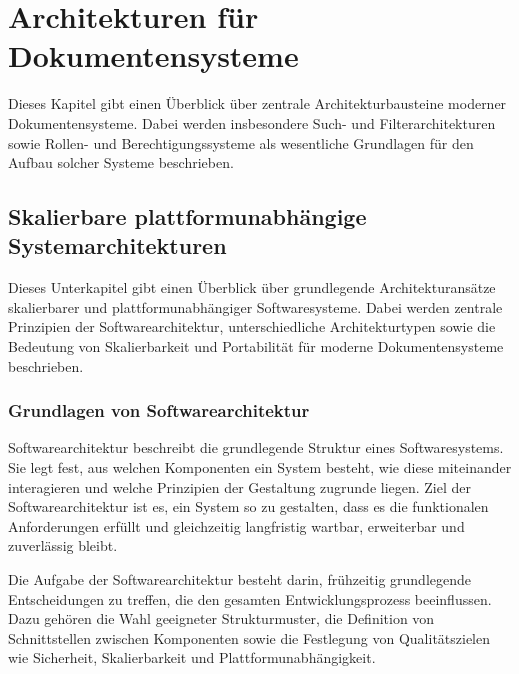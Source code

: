 \section{Architekturen für Dokumentensysteme}
\label{chapter:Architekturen_fuer_Dokumentensysteme}

Dieses Kapitel gibt einen Überblick über zentrale Architekturbausteine moderner
Dokumentensysteme. Dabei werden insbesondere Such- und Filterarchitekturen sowie
Rollen- und Berechtigungssysteme als wesentliche Grundlagen für den Aufbau solcher
Systeme beschrieben.

\subsection{Skalierbare plattformunabhängige Systemarchitekturen}

Dieses Unterkapitel gibt einen Überblick über grundlegende Architekturansätze
skalierbarer und plattformunabhängiger Softwaresysteme. Dabei werden zentrale
Prinzipien der Softwarearchitektur, unterschiedliche Architekturtypen sowie die
Bedeutung von Skalierbarkeit und Portabilität für moderne Dokumentensysteme
beschrieben.

\subsubsection{Grundlagen von Softwarearchitektur}

Softwarearchitektur beschreibt die grundlegende Struktur eines Softwaresystems.
Sie legt fest, aus welchen Komponenten ein System besteht, wie diese miteinander
interagieren und welche Prinzipien der Gestaltung zugrunde liegen.
Ziel der Softwarearchitektur ist es, ein System so zu gestalten, dass es die
funktionalen Anforderungen erfüllt und gleichzeitig langfristig wartbar, erweiterbar
und zuverlässig bleibt. \cite{bass2012software}

Die Aufgabe der Softwarearchitektur besteht darin, frühzeitig grundlegende
Entscheidungen zu treffen, die den gesamten Entwicklungsprozess beeinflussen.
Dazu gehören die Wahl geeigneter Strukturmuster, die Definition von Schnittstellen
zwischen Komponenten sowie die Festlegung von Qualitätszielen wie Sicherheit,
Skalierbarkeit und Plattformunabhängigkeit. \cite{bass2012software}

